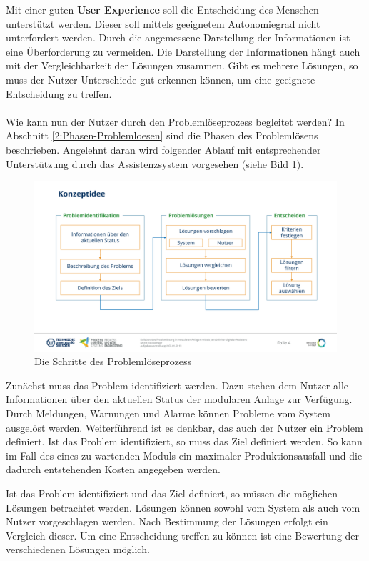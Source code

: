Mit einer guten \textbf{User Experience} soll die Entscheidung des Menschen unterstützt werden. Dieser soll mittels geeignetem Autonomiegrad nicht unterfordert werden. Durch die angemessene Darstellung der Informationen ist eine Überforderung zu vermeiden. Die Darstellung der Informationen hängt auch mit der Vergleichbarkeit der Lösungen zusammen. Gibt es mehrere Lösungen, so muss der Nutzer Unterschiede gut erkennen können, um eine geeignete Entscheidung zu treffen.
\\ \\
Wie kann nun der Nutzer durch den Problemlöseprozess begleitet werden? In Abschnitt \ref{2:Phasen-Problemloesen} sind die Phasen des Problemlösens beschrieben. Angelehnt daran wird folgender Ablauf mit entsprechender Unterstützung durch das Assistenzsystem vorgesehen (siehe Bild \ref{pic:Konzeptidee}).
\begin{figure}[htbp]
\centering
\includegraphics[scale=0.45]{DA_files/Bilder/Konzept/Konzeptidee.pdf}
\caption{Die Schritte des Problemlöseprozess}
\label{pic:Konzeptidee}
\end{figure}

Zunächst muss das Problem identifiziert werden. Dazu stehen dem Nutzer alle Informationen über den aktuellen Status der modularen Anlage zur Verfügung. Durch Meldungen, Warnungen und Alarme können Probleme vom System ausgelöst werden. Weiterführend ist es denkbar, das auch der Nutzer ein Problem definiert. Ist das Problem identifiziert, so muss das Ziel definiert werden. So kann im Fall des eines zu wartenden Moduls ein maximaler Produktionsausfall und die dadurch entstehenden Kosten angegeben werden.

Ist das Problem identifiziert und das Ziel definiert, so müssen die möglichen Lösungen betrachtet werden. Lösungen können sowohl vom System als auch vom Nutzer vorgeschlagen werden. Nach Bestimmung der Lösungen erfolgt ein Vergleich dieser. Um eine Entscheidung treffen zu können ist eine Bewertung der verschiedenen Lösungen möglich.

